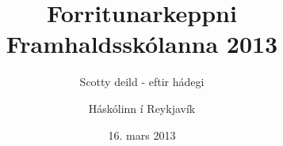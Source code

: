 \documentclass[11pt,a4paper,oneside]{article}
\title{Forritunarkeppni Framhaldsskólanna 2013}
\subtitle{Scotty deild - eftir hádegi}
\date{16. mars 2013}
\author{Háskólinn í Reykjavík}
\newcommand{\problemstatement}[1]{  }
\newcounter{problemCounter}
\begin{document}
	\maketitle
	\thispagestyle{empty}
	\pagebreak

    
    \problemstatement{veldi_af_2}
    \problemstatement{ofugur_texti}
    \problemstatement{kula_i_kassa}
    \problemstatement{lykilord}
    \problemstatement{kelvin_fahrenheit}
    \problemstatement{oradad}
    \problemstatement{lodrettur_texti}
    \problemstatement{fizzbuzz}
    \problemstatement{inniheldur_tolu}
    \problemstatement{dagatal}
    \problemstatement{slongu_texti}
    \problemstatement{hjolalas}
    \problemstatement{freq_analysis}
    \problemstatement{fullkomintala}
    \problemstatement{translate}
    \problemstatement{bmi}
    \problemstatement{stae_pusl}
    \problemstatement{samlagning}
\end{document}
